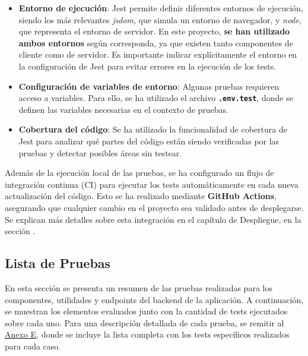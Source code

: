 \begin{itemize}
    \item \textbf{Entorno de ejecución}: Jest permite definir diferentes entornos de ejecución, siendo los más relevantes \textit{jsdom}, que simula un entorno de navegador, y \textit{node}, que representa el entorno de servidor. En este proyecto, \textbf{se han utilizado ambos entornos} según corresponda, ya que existen tanto componentes de cliente como de servidor. Es importante indicar explícitamente el entorno en la configuración de Jest para evitar errores en la ejecución de los tests.

    \item \textbf{Configuración de variables de entorno}: Algunas pruebas requieren acceso a variables. Para ello, se ha utilizado el archivo \textbf{\texttt{.env.test}}, donde se definen las variables necesarias en el contexto de pruebas.

    \item \textbf{Cobertura del código}: Se ha utilizado la funcionalidad de cobertura de Jest para analizar qué partes del código están siendo verificadas por las pruebas y detectar posibles áreas sin testear.
\end{itemize}

Además de la ejecución local de las pruebas, se ha configurado un flujo de integración continua (CI) para ejecutar los tests automáticamente en cada nueva actualización del código. Esto se ha realizado mediante \textbf{GitHub Actions}, asegurando que cualquier cambio en el proyecto sea validado antes de desplegarse. Se explican más detalles sobre esta integración en el capítulo de Despliegue, en la sección .

\subsection{Lista de Pruebas}

En esta sección se presenta un resumen de las pruebas realizadas para los componentes, utilidades y endpoints del backend de la aplicación. A continuación, se muestran los elementos evaluados junto con la cantidad de tests ejecutados sobre cada uno. Para una descripción detallada de cada prueba, se remitir al \hyperref[ch:anexoE]{Anexo E}, donde se incluye la lista completa con los tests específicos realizados para cada caso.

